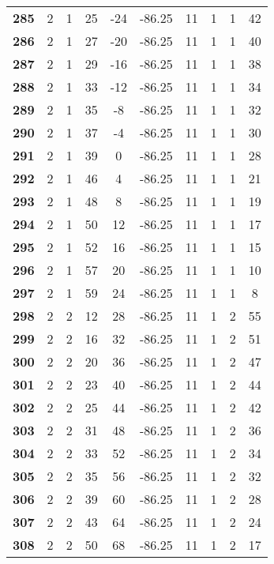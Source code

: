 \documentclass{article}%
\begin{document}
\begin{longtable}{cccccccccc}
        \textbf{285} & 2 & 1 & 25 & -24 & -86.25 & 11 & 1 & 1 & 42 \\ 
        \textbf{286} & 2 & 1 & 27 & -20 & -86.25 & 11 & 1 & 1 & 40 \\ 
        \textbf{287} & 2 & 1 & 29 & -16 & -86.25 & 11 & 1 & 1 & 38 \\ 
        \textbf{288} & 2 & 1 & 33 & -12 & -86.25 & 11 & 1 & 1 & 34 \\ 
        \textbf{289} & 2 & 1 & 35 & -8 & -86.25 & 11 & 1 & 1 & 32 \\ 
        \textbf{290} & 2 & 1 & 37 & -4 & -86.25 & 11 & 1 & 1 & 30 \\ 
        \textbf{291} & 2 & 1 & 39 & 0 & -86.25 & 11 & 1 & 1 & 28 \\ 
        \textbf{292} & 2 & 1 & 46 & 4 & -86.25 & 11 & 1 & 1 & 21 \\ 
        \textbf{293} & 2 & 1 & 48 & 8 & -86.25 & 11 & 1 & 1 & 19 \\ 
        \textbf{294} & 2 & 1 & 50 & 12 & -86.25 & 11 & 1 & 1 & 17 \\ 
        \textbf{295} & 2 & 1 & 52 & 16 & -86.25 & 11 & 1 & 1 & 15 \\ 
        \textbf{296} & 2 & 1 & 57 & 20 & -86.25 & 11 & 1 & 1 & 10 \\ 
        \textbf{297} & 2 & 1 & 59 & 24 & -86.25 & 11 & 1 & 1 & 8 \\ 
        \textbf{298} & 2 & 2 & 12 & 28 & -86.25 & 11 & 1 & 2 & 55 \\ 
        \textbf{299} & 2 & 2 & 16 & 32 & -86.25 & 11 & 1 & 2 & 51 \\ 
        \textbf{300} & 2 & 2 & 20 & 36 & -86.25 & 11 & 1 & 2 & 47 \\ 
        \textbf{301} & 2 & 2 & 23 & 40 & -86.25 & 11 & 1 & 2 & 44 \\ 
        \textbf{302} & 2 & 2 & 25 & 44 & -86.25 & 11 & 1 & 2 & 42 \\ 
        \textbf{303} & 2 & 2 & 31 & 48 & -86.25 & 11 & 1 & 2 & 36 \\ 
        \textbf{304} & 2 & 2 & 33 & 52 & -86.25 & 11 & 1 & 2 & 34 \\ 
        \textbf{305} & 2 & 2 & 35 & 56 & -86.25 & 11 & 1 & 2 & 32 \\ 
        \textbf{306} & 2 & 2 & 39 & 60 & -86.25 & 11 & 1 & 2 & 28 \\ 
        \textbf{307} & 2 & 2 & 43 & 64 & -86.25 & 11 & 1 & 2 & 24 \\ 
        \textbf{308} & 2 & 2 & 50 & 68 & -86.25 & 11 & 1 & 2 & 17 \\ 

\end{longtable}
\end{document}
